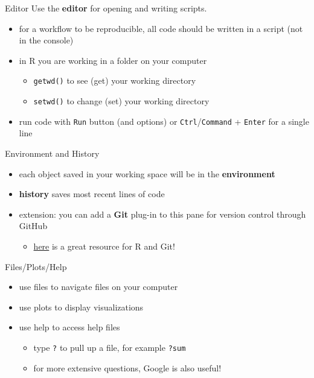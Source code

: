 \documentclass[
  ignorenonframetext,
]{beamer}
\providecommand{\tightlist}{%
  \setlength{\itemsep}{0pt}\setlength{\parskip}{0pt}}
\begin{document}
\begin{frame}[fragile]{Editor}
\label{editor}
Use the \textbf{editor} for opening and writing scripts.

\begin{itemize}
\tightlist
\item
  for a workflow to be reproducible, all code should be written in a
  script (not in the console)
\item
  in R you are working in a folder on your computer

  \begin{itemize}
  \tightlist
  \item
    \texttt{getwd()} to see (get) your working directory
  \item
    \texttt{setwd()} to change (set) your working directory
  \end{itemize}
\item
  run code with \texttt{Run} button (and options) or
  \texttt{Ctrl}/\texttt{Command} + \texttt{Enter} for a single line
\end{itemize}
\end{frame}

\begin{frame}{Environment and History}
\label{environment-and-history}
\begin{itemize}
\tightlist
\item
  each object saved in your working space will be in the
  \textbf{environment}
\item
  \textbf{history} saves most recent lines of code
\item
  extension: you can add a \textbf{Git} plug-in to this pane for version
  control through GitHub

  \begin{itemize}
  \tightlist
  \item
    \href{https://happygitwithr.com/index.html}{here} is a great
    resource for R and Git!
  \end{itemize}
\end{itemize}
\end{frame}

\begin{frame}[fragile]{Files/Plots/Help}
\label{filesplotshelp}
\begin{itemize}
\tightlist
\item
  use files to navigate files on your computer
\item
  use plots to display visualizations
\item
  use help to access help files

  \begin{itemize}
  \tightlist
  \item
    type \texttt{?} to pull up a file, for example \texttt{?sum}
  \item
    for more extensive questions, Google is also useful!
  \end{itemize}
\end{itemize}
\end{frame}
\end{document}
